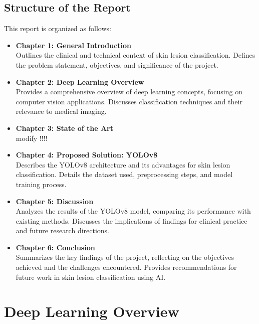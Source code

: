 \documentclass[a4paper,12pt]{report}
\begin{document}
\begin{spacing}{1.5}
    \section{Structure of the Report}
    This report is organized as follows:

    \begin{itemize}
        \item \textbf{Chapter 1: General Introduction} \\
        Outlines the clinical and technical context of skin lesion classification. Defines the problem statement, objectives, and significance of the project.

        \item \textbf{Chapter 2: Deep Learning Overview} \\
        Provides a comprehensive overview of deep learning concepts, focusing on computer vision applications. Discusses classification techniques and their relevance to medical imaging.

        \item \textbf{Chapter 3: State of the Art} \\
        modify !!!!

        \item \textbf{Chapter 4: Proposed Solution: YOLOv8} \\
        Describes the YOLOv8 architecture and its advantages for skin lesion classification. Details the dataset used, preprocessing steps, and model training process.

        \item \textbf{Chapter 5: Discussion} \\
        Analyzes the results of the YOLOv8 model, comparing its performance with existing methods. Discusses the implications of findings for clinical practice and future research directions.

        \item \textbf{Chapter 6: Conclusion} \\
        Summarizes the key findings of the project, reflecting on the objectives achieved and the challenges encountered. Provides recommendations for future work in skin lesion classification using AI.

    \end{itemize}



\chapter{Deep Learning Overview}

\end{spacing}
\end{document}
